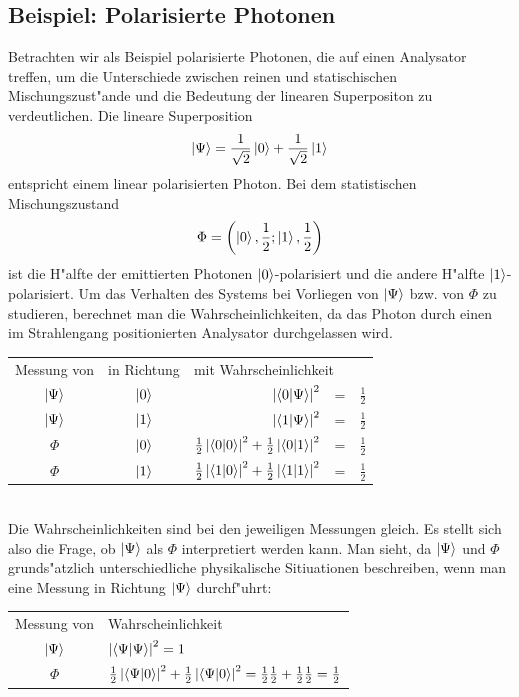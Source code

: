   \subsection{Beispiel: Polarisierte Photonen}
    Betrachten wir als Beispiel polarisierte Photonen, die auf einen Analysator treffen, um die Unterschiede zwischen reinen und statischischen Mischungszust"ande und die Bedeutung 
    der linearen Superpositon zu verdeutlichen. Die lineare Superposition 
    $$ \left| \Psi \right> = \frac{1}{\sqrt{2}}\left| 0 \right> + \frac{1}{\sqrt{2}}\left| 1 \right> $$
    entspricht einem linear polarisierten Photon. Bei dem statistischen Mischungszustand 
    $$ \Phi = \left( \left| 0 \right>,\frac{1}{2};\left| 1 \right>,\frac{1}{2}\right) $$
    ist die H"alfte der emittierten Photonen $\left| 0 \right>$-polarisiert und die andere H"alfte $\left| 1 \right>$-polarisiert. Um das Verhalten des Systems bei Vorliegen von $\left| \Psi \right>$ bzw.
    von $\Phi$ zu studieren, berechnet man die Wahrscheinlichkeiten, da\3 das Photon durch einen im Strahlengang positionierten Analysator durchgelassen wird. \\
    \begin{tabular}{ccrcl}
      Messung von      &    in Richtung     & \multicolumn{3}{l}{mit Wahrscheinlichkeit}\\
      $\left| \Psi \right>$     &   $\left| 0 \right>$        &   $\left| \left< 0 | \Psi \right> \right|^2$ &=& $\frac{1}{2}$ \\
      $\left| \Psi \right>$     &   $\left| 1 \right>$        &   $\left| \left< 1 | \Psi \right> \right|^2$ &=& $\frac{1}{2}$ \\
      $\Phi$           &   $\left| 0 \right>$        &   $\frac{1}{2}\left| \left< 0 | 0 \right> \right|^2+\frac{1}{2}\left| \left< 0 | 1 \right> \right|^2$ &=& $\frac{1}{2}$ \\
      $\Phi$           &   $\left| 1 \right>$        &   $\frac{1}{2}\left| \left< 1 | 0 \right> \right|^2+\frac{1}{2}\left| \left< 1 | 1 \right> \right|^2$ &=& $\frac{1}{2}$ \\
    \end{tabular} \\
    Die Wahrscheinlichkeiten sind bei den jeweiligen Messungen gleich. Es stellt sich also die Frage, ob $\left| \Psi \right>$ als $\Phi$ interpretiert werden kann. Man sieht, da\3 
    $\left| \Psi \right>$ und $\Phi$ grunds"atzlich unterschiedliche physikalische Sitiuationen beschreiben, wenn man eine Messung in Richtung $\left| \Psi \right>$ durchf"uhrt: \\
    \begin{tabular}{cl}
       Messung von    &    Wahrscheinlichkeit \\
       $\left| \Psi \right>$   &    $\left| \left< \Psi | \Psi \right> \right|^2=1$ \\
       $\Phi$         &    $\frac{1}{2}\left| \left< \Psi | 0 \right> \right|^2 + \frac{1}{2}\left| \left< \Psi | 0 \right> \right|^2 = \frac{1}{2}\frac{1}{2} + \frac{1}{2}\frac{1}{2} = \frac{1}{2}$
    \end{tabular} \\
